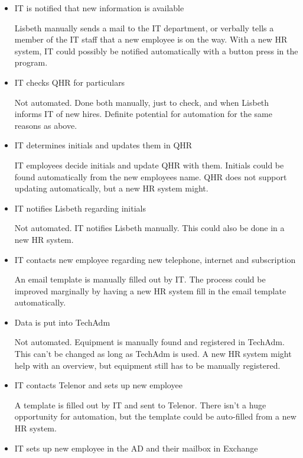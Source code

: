 \begin{itemize}
	\item{IT is notified that new information is available}
	
		Lisbeth manually sends a mail to the IT department, or verbally tells a member of the IT staff that a new employee is on the way.
		With a new HR system, IT could possibly be notified automatically with a button press in the program.		
	
	\item{IT checks QHR for particulars}
	
		Not automated. Done both manually, just to check, and when Lisbeth informs IT of new hires.
		Definite potential for automation for the same reasons as above.
	
	\item{IT determines initials and updates them in QHR}
	
		IT employees decide initials and update QHR with them. Initials could be found automatically from the new employees name. QHR does not support updating automatically, but a new HR system might.
	
	\item{IT notifies Lisbeth regarding initials}
	
		Not automated. IT notifies Lisbeth manually. This could also be done in a new HR system.
	
	\item{IT contacts new employee regarding new telephone, internet and subscription}
	
		An email template is manually filled out by IT. The process could be improved marginally by having a new HR system fill in the email template automatically.
	
	\item{Data is put into TechAdm}
	
		Not automated. Equipment is manually found and registered in TechAdm.
		This can't be changed as long as TechAdm is used. A new HR system might help with an overview, but equipment still has to be manually registered.
	
	\item{IT contacts Telenor and sets up new employee}
	
		A template is filled out by IT and sent to Telenor. There isn't a huge opportunity for automation, but the template could be auto-filled from a new HR system.
	
	\item{IT sets up new employee in the AD and their mailbox in Exchange}
	

\end{itemize}
